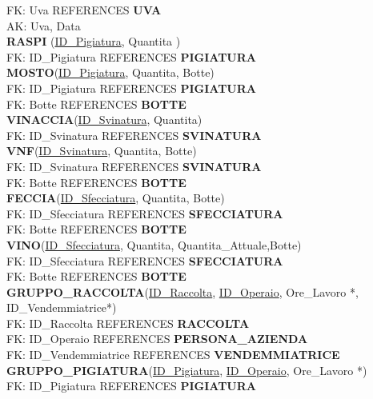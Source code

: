 \documentclass{article}
\begin{document}
FK: Uva REFERENCES \textbf{UVA}\\
AK: Uva, Data \\\newline
\textbf{RASPI }(\underline{ID\_Pigiatura}, Quantita )\\
FK: ID\_Pigiatura REFERENCES \textbf{PIGIATURA}\\\newline
\textbf{MOSTO}(\underline{ID\_Pigiatura},  Quantita, Botte)\\
FK: ID\_Pigiatura REFERENCES \textbf{PIGIATURA}\\
FK: Botte REFERENCES \textbf{BOTTE}\\\newline
\textbf{VINACCIA}(\underline{ID\_Svinatura},  Quantita)\\
FK: ID\_Svinatura REFERENCES \textbf{SVINATURA}\\\newline
\textbf{VNF}(\underline{ID\_Svinatura},  Quantita, Botte)\\
FK: ID\_Svinatura REFERENCES \textbf{SVINATURA}\\
FK: Botte REFERENCES \textbf{BOTTE}\\\newline
\textbf{FECCIA}(\underline{ID\_Sfecciatura},  Quantita, Botte)\\
FK: ID\_Sfecciatura REFERENCES \textbf{SFECCIATURA}\\
FK: Botte REFERENCES \textbf{BOTTE}\\\newline
\textbf{VINO}(\underline{ID\_Sfecciatura},  Quantita, Quantita\_Attuale,Botte)\\
FK: ID\_Sfecciatura REFERENCES \textbf{SFECCIATURA}\\
FK: Botte REFERENCES \textbf{BOTTE}\\\newline
\textbf{GRUPPO\_RACCOLTA}(\underline{ID\_Raccolta}, \underline{ID\_Operaio}, Ore\_Lavoro *, ID\_Vendemmiatrice*)\\
FK: ID\_Raccolta REFERENCES \textbf{RACCOLTA}\\
FK: ID\_Operaio REFERENCES \textbf{PERSONA\_AZIENDA}\\
FK: ID\_Vendemmiatrice REFERENCES \textbf{VENDEMMIATRICE}\\\newline
\textbf{GRUPPO\_PIGIATURA}(\underline{ID\_Pigiatura}, \underline{ID\_Operaio}, Ore\_Lavoro *)\\
FK: ID\_Pigiatura REFERENCES \textbf{PIGIATURA}\\
\end{document}
